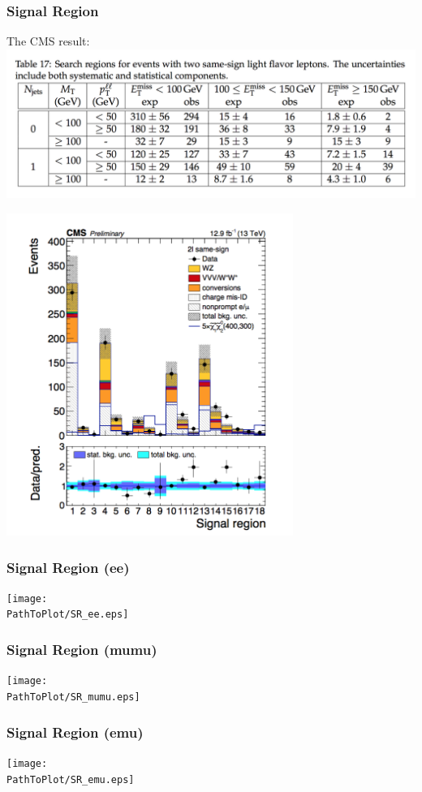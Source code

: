 \documentclass[mathserif,serif]{beamer}
\begin{document}
\begin{frame}
\frametitle{Signal Region}
The CMS result:
\includegraphics[width=1\textwidth]{data/photo/result.png}
\end{frame}

\begin{frame}
\includegraphics[width=0.7\textwidth]{data/photo/BG.png}
\end{frame}

\def \PathToPlot {../plot}
\begin{frame}
\frametitle{Signal Region (ee)}
\texttt{[image: \\PathToPlot/SR\_ee.eps]}
\end{frame}

\begin{frame}
\frametitle{Signal Region (mumu)}
\texttt{[image: \\PathToPlot/SR\_mumu.eps]}
\end{frame}

\begin{frame}
\frametitle{Signal Region (emu)}
\texttt{[image: \\PathToPlot/SR\_emu.eps]}
\end{frame}
\end{document}
